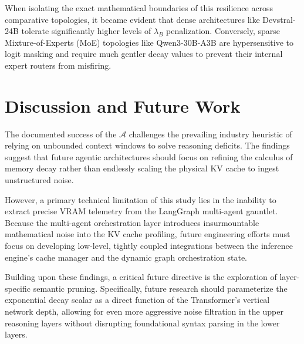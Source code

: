 \documentclass[11pt,a4paper]{article}
\newcommand{\bryanCoeff}{\lambda_B}
\newcommand{\ablTensor}{\mathcal{A}}
\begin{document}
When isolating the exact mathematical boundaries of this resilience across comparative topologies, it became evident that dense architectures like Devstral-24B tolerate significantly higher levels of \(\bryanCoeff\) penalization. Conversely, sparse Mixture-of-Experts (MoE) topologies like Qwen3-30B-A3B are hypersensitive to logit masking and require much gentler decay values to prevent their internal expert routers from misfiring.

\section{Discussion and Future Work}

The documented success of the \(\ablTensor\) challenges the prevailing industry heuristic of relying on unbounded context windows to solve reasoning deficits. The findings suggest that future agentic architectures should focus on refining the calculus of memory decay rather than endlessly scaling the physical KV cache to ingest unstructured noise.

However, a primary technical limitation of this study lies in the inability to extract precise VRAM telemetry from the LangGraph multi-agent gauntlet. Because the multi-agent orchestration layer introduces insurmountable mathematical noise into the KV cache profiling, future engineering efforts must focus on developing low-level, tightly coupled integrations between the inference engine's cache manager and the dynamic graph orchestration state. 

Building upon these findings, a critical future directive is the exploration of layer-specific semantic pruning. Specifically, future research should parameterize the exponential decay scalar as a direct function of the Transformer's vertical network depth, allowing for even more aggressive noise filtration in the upper reasoning layers without disrupting foundational syntax parsing in the lower layers.

\end{document}
